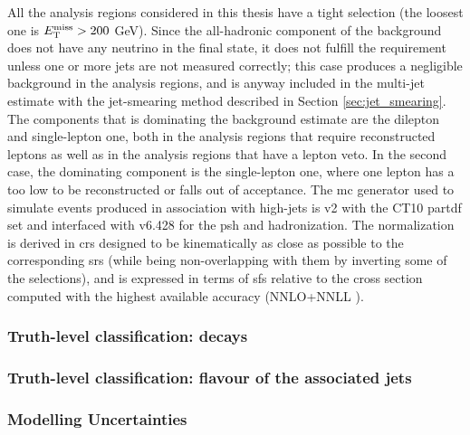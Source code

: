 All the analysis regions considered in this thesis have a tight \met selection (the loosest one is $E_{\rm T}^{\mathrm{miss}} > 200$ GeV). Since the all-hadronic component 
of the \ttbar background does not have any neutrino in the final state, it does not fulfill the \met requirement unless one or more jets are not measured correctly; this case produces a negligible background in the analysis regions, and is anyway included in the multi-jet estimate with the jet-smearing method described in Section \ref{sec:jet_smearing}.
The \ttbar components that is dominating the background estimate are the dilepton and single-lepton one, both in the analysis regions that require reconstructed leptons as well as in the analysis regions that have a lepton veto.
In the second case, the dominating component is the single-lepton one, where one lepton has a \pt too low to be reconstructed or falls out of acceptance. 
The \gls{mc} generator used to simulate \ttbar events produced in association with high-\pt jets is \PowhegBox v2 with the CT10 \gls{partdf} set \cite{Lai:2010vv} and interfaced with \PY v6.428 \cite{Sjostrand:2006za} for the \gls{psh} and hadronization. 
The normalization is derived in \glspl{cr} designed to be kinematically as close as possible to the corresponding \glspl{sr} (while being non-overlapping with them by inverting some of the selections), and is expressed in terms of \glspl{sf} relative to the cross section computed with the highest
available accuracy (NNLO+NNLL \cite{Czakon:2011xx}).

\subsubsection{Truth-level classification: \ttbar decays}

\subsubsection{Truth-level classification: flavour of the associated jets}


\subsubsection{Modelling Uncertainties}

